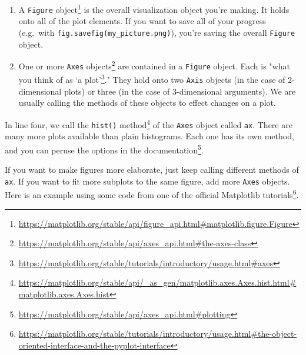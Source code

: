\documentclass[
  12pt,
  krantz2]{krantz}
\renewcommand{\href}[2]{#2\footnote{\url{#1}}}
\begin{document}
\begin{enumerate}
\def\labelenumi{\arabic{enumi}.}
\item
  A \href{https://matplotlib.org/stable/api/figure_api.html\#matplotlib.figure.Figure}{\texttt{Figure} object} is the overall visualization object you're making. It holds onto all of the plot elements. If you want to save all of your progress (e.g.~with \texttt{fig.savefig(\textquotesingle{}my\_picture.png\textquotesingle{})}), you're saving the overall \texttt{Figure} object.
\item
  One or more \href{https://matplotlib.org/stable/api/axes_api.html\#the-axes-class}{\texttt{Axes} objects} are contained in a \texttt{Figure} object. Each is \href{https://matplotlib.org/stable/tutorials/introductory/usage.html\#axes}{"what you think of as `a plot'}." They hold onto two \texttt{Axis} objects (in the case of 2-dimensional plots) or three (in the case of 3-dimensional arguments). We are usually calling the methods of these objects to effect changes on a plot.
\end{enumerate}

In line four, we call the \href{https://matplotlib.org/stable/api/_as_gen/matplotlib.axes.Axes.hist.html\#matplotlib.axes.Axes.hist}{\texttt{hist()} method} of the \texttt{Axes} object called \texttt{ax}. There are many more plots available than plain histograms. Each one has its own method, and you can peruse the options in \href{https://matplotlib.org/stable/api/axes_api.html\#plotting}{the documentation}.

If you want to make figures more elaborate, just keep calling different methods of \texttt{ax}. If you want to fit more subplots to the same figure, add more \texttt{Axes} objects. Here is an example using some code from \href{https://matplotlib.org/stable/tutorials/introductory/usage.html\#the-object-oriented-interface-and-the-pyplot-interface}{one of the official Matplotlib tutorials}.
\end{document}
